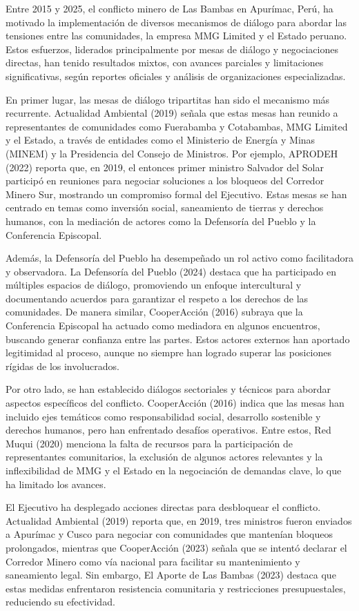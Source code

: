 \documentclass[
  stu,
  floatsintext,
  longtable,
  a4paper,
  nolmodern,
  notxfonts,
  notimes,
  colorlinks=true,linkcolor=blue,citecolor=blue,urlcolor=blue]{apa7}
\begin{document}
Entre 2015 y 2025, el conflicto minero de Las Bambas en Apurímac, Perú,
ha motivado la implementación de diversos mecanismos de diálogo para
abordar las tensiones entre las comunidades, la empresa MMG Limited y el
Estado peruano. Estos esfuerzos, liderados principalmente por mesas de
diálogo y negociaciones directas, han tenido resultados mixtos, con
avances parciales y limitaciones significativas, según reportes
oficiales y análisis de organizaciones especializadas.

En primer lugar, las mesas de diálogo tripartitas han sido el mecanismo
más recurrente. Actualidad Ambiental (2019) señala que estas mesas han
reunido a representantes de comunidades como Fuerabamba y Cotabambas,
MMG Limited y el Estado, a través de entidades como el Ministerio de
Energía y Minas (MINEM) y la Presidencia del Consejo de Ministros. Por
ejemplo, APRODEH (2022) reporta que, en 2019, el entonces primer
ministro Salvador del Solar participó en reuniones para negociar
soluciones a los bloqueos del Corredor Minero Sur, mostrando un
compromiso formal del Ejecutivo. Estas mesas se han centrado en temas
como inversión social, saneamiento de tierras y derechos humanos, con la
mediación de actores como la Defensoría del Pueblo y la Conferencia
Episcopal.

Además, la Defensoría del Pueblo ha desempeñado un rol activo como
facilitadora y observadora. La Defensoría del Pueblo (2024) destaca que
ha participado en múltiples espacios de diálogo, promoviendo un enfoque
intercultural y documentando acuerdos para garantizar el respeto a los
derechos de las comunidades. De manera similar, CooperAcción (2016)
subraya que la Conferencia Episcopal ha actuado como mediadora en
algunos encuentros, buscando generar confianza entre las partes. Estos
actores externos han aportado legitimidad al proceso, aunque no siempre
han logrado superar las posiciones rígidas de los involucrados.

Por otro lado, se han establecido diálogos sectoriales y técnicos para
abordar aspectos específicos del conflicto. CooperAcción (2016) indica
que las mesas han incluido ejes temáticos como responsabilidad social,
desarrollo sostenible y derechos humanos, pero han enfrentado desafíos
operativos. Entre estos, Red Muqui (2020) menciona la falta de recursos
para la participación de representantes comunitarios, la exclusión de
algunos actores relevantes y la inflexibilidad de MMG y el Estado en la
negociación de demandas clave, lo que ha limitado los avances.

El Ejecutivo ha desplegado acciones directas para desbloquear el
conflicto. Actualidad Ambiental (2019) reporta que, en 2019, tres
ministros fueron enviados a Apurímac y Cusco para negociar con
comunidades que mantenían bloqueos prolongados, mientras que
CooperAcción (2023) señala que se intentó declarar el Corredor Minero
como vía nacional para facilitar su mantenimiento y saneamiento legal.
Sin embargo, El Aporte de Las Bambas (2023) destaca que estas medidas
enfrentaron resistencia comunitaria y restricciones presupuestales,
reduciendo su efectividad.
\end{document}
